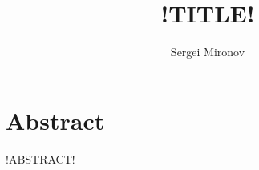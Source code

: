 \documentclass{article}
\title{!TITLE!}
\author{Sergei Mironov}
\begin{document}
\maketitle

\section*{Abstract}

!ABSTRACT!

\tableofcontents



\printbibliography
\end{document}
